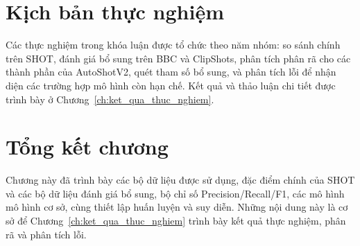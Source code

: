 \section{Kịch bản thực nghiệm}
\label{sec:experimental_scenarios}
Các thực nghiệm trong khóa luận được tổ chức theo năm nhóm: so sánh chính trên SHOT, đánh giá bổ sung trên BBC và ClipShots, phân tích phân rã cho các thành phần của AutoShotV2, quét tham số bổ sung, và phân tích lỗi để nhận diện các trường hợp mô hình còn hạn chế. Kết quả và thảo luận chi tiết được trình bày ở Chương~\ref{ch:ket_qua_thuc_nghiem}.

\section{Tổng kết chương}
Chương này đã trình bày các bộ dữ liệu được sử dụng, đặc điểm chính của SHOT và các bộ dữ liệu đánh giá bổ sung, bộ chỉ số Precision/Recall/F1, các mô hình mô hình cơ sở, cùng thiết lập huấn luyện và suy diễn. Những nội dung này là cơ sở để Chương~\ref{ch:ket_qua_thuc_nghiem} trình bày kết quả thực nghiệm, phân rã và phân tích lỗi.
